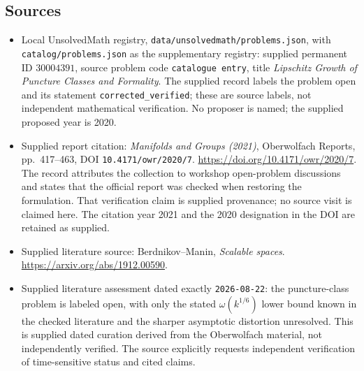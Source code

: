 \documentclass[11pt]{article}
\begin{document}
\subsection{Sources}
\begin{itemize}
\item Local UnsolvedMath registry, \texttt{data/unsolvedmath/problems.json}, with \texttt{catalog/problems.json} as the supplementary registry: supplied permanent ID \(30004391\), source problem code \texttt{catalogue entry}, title \emph{Lipschitz Growth of Puncture Classes and Formality}. The supplied record labels the problem open and its statement \texttt{corrected\_verified}; these are source labels, not independent mathematical verification. No proposer is named; the supplied proposed year is 2020.
\item Supplied report citation: \emph{Manifolds and Groups (2021)}, Oberwolfach Reports, pp.\ 417--463, DOI \texttt{10.4171/owr/2020/7}. \url{https://doi.org/10.4171/owr/2020/7}. The record attributes the collection to workshop open-problem discussions and states that the official report was checked when restoring the formulation. That verification claim is supplied provenance; no source visit is claimed here. The citation year 2021 and the 2020 designation in the DOI are retained as supplied.
\item Supplied literature source: Berdnikov--Manin, \emph{Scalable spaces}. \url{https://arxiv.org/abs/1912.00590}.
\item Supplied literature assessment dated exactly \texttt{2026-08-22}: the puncture-class problem is labeled open, with only the stated \(\omega(k^{1/6})\) lower bound known in the checked literature and the sharper asymptotic distortion unresolved. This is supplied dated curation derived from the Oberwolfach material, not independently verified. The source explicitly requests independent verification of time-sensitive status and cited claims.
\end{itemize}
\end{document}
